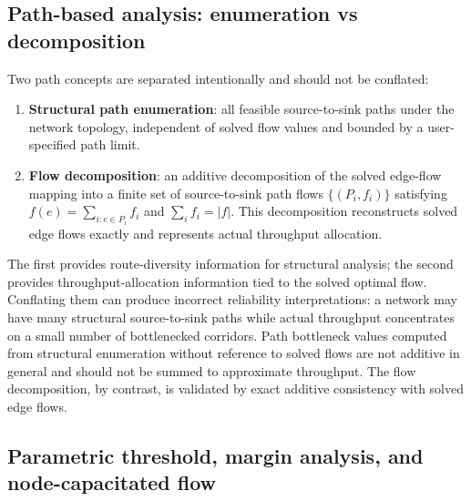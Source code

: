 \documentclass[12pt]{report}
\begin{document}
\subsection{Path-based analysis: enumeration vs decomposition}

Two path concepts are separated intentionally and should not be conflated:

\begin{enumerate}
    \item \textbf{Structural path enumeration}: all feasible source-to-sink paths under the network topology, independent of solved flow values and bounded by a user-specified path limit.
    \item \textbf{Flow decomposition}: an additive decomposition of the solved edge-flow mapping into a finite set of source-to-sink path flows $\{(P_i, f_i)\}$ satisfying $f(e)=\sum_{i: e\in P_i} f_i$ and $\sum_i f_i = |f|$. This decomposition reconstructs solved edge flows exactly and represents actual throughput allocation.
\end{enumerate}

The first provides route-diversity information for structural analysis; the second provides throughput-allocation information tied to the solved optimal flow. Conflating them can produce incorrect reliability interpretations: a network may have many structural source-to-sink paths while actual throughput concentrates on a small number of bottlenecked corridors. Path bottleneck values computed from structural enumeration without reference to solved flows are not additive in general and should not be summed to approximate throughput. The flow decomposition, by contrast, is validated by exact additive consistency with solved edge flows.

\subsection{Parametric threshold, margin analysis, and node-capacitated flow}
\end{document}
